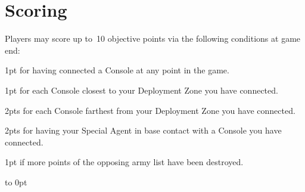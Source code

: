 \section{Scoring}

Players may score up to~10 objective points via the following
conditions at game end:
\begin{squishitemize}
\item 1pt for having connected a Console at any point in the game.
\item 1pt for each Console closest to your Deployment Zone you have connected.
\item 2pts for each Console farthest from your Deployment Zone
  you have connected.
\item 2pts for having your Special Agent in base contact with a
  Console you have connected.
\item 1pt if more points of the opposing army list have been destroyed.
\end{squishitemize}

\vfill
\vbox to 0pt{}